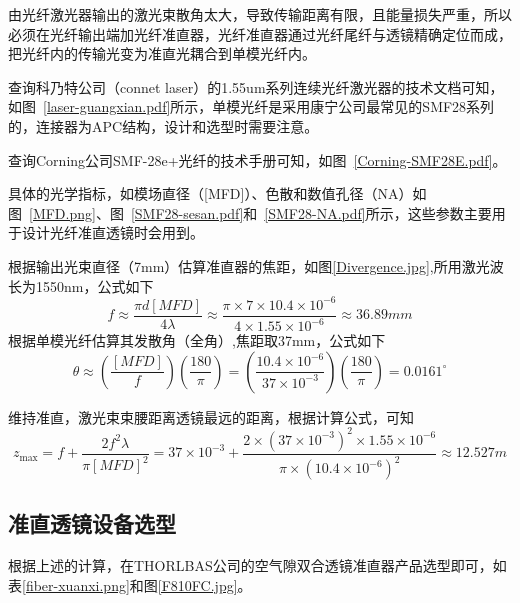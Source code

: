 
由光纤激光器输出的激光束散角太大，导致传输距离有限，且能量损失严重，所以必须在光纤输出端加光纤准直器，光纤准直器通过光纤尾纤与透镜精确定位而成，把光纤内的传输光变为准直光耦合到单模光纤内。

查询科乃特公司（connet laser）的1.55um系列连续光纤激光器的技术文档可知，如图~\ref{laser-guangxian.pdf}所示，单模光纤是采用康宁公司最常见的SMF28系列的，连接器为APC结构，设计和选型时需要注意。


查询Corning公司SMF-28e+光纤的技术手册可知，如图~\ref{Corning-SMF28E.pdf}。


具体的光学指标，如模场直径（[MFD]）、色散和数值孔径（NA）如图~\ref{MFD.png}、图~\ref{SMF28-sesan.pdf}和~\ref{SMF28-NA.pdf}所示，这些参数主要用于设计光纤准直透镜时会用到。


根据输出光束直径（7mm）估算准直器的焦距，如图\ref{Divergence.jpg},所用激光波长为1550nm，公式如下
$$ f \approx \frac { \pi d [ M F D ]} {  4 \lambda  }  \approx \frac { \pi \times 7 \times 10.4 \times 10^{-6}} {  4 \times 1.55 \times 10^{-6}  } \approx 36.89 mm $$
根据单模光纤估算其发散角（全角）,焦距取37mm，公式如下
$$ \theta \approx \left( \frac { [ M F D ] } { f } \right) \left( \frac { 180 } { \pi } \right) =  \left( \frac { 10.4 \times 10^{-6}} { 37 \times 10^{-3} } \right) \left( \frac { 180 } { \pi } \right) =  0.0161 ^{\circ} $$

维持准直，激光束束腰距离透镜最远的距离，根据计算公式，可知
$$ z _ { \max } = f + \frac { 2 f ^ { 2 } \lambda } { \pi [ M F D ] ^ { 2 } } =  37\times 10^{-3} + \frac { 2 \times\left(37\times 10^{-3}\right)^ { 2 } \times 1.55\times 10^{-6} } { \pi \times\left({10.4\times 10^{-6}} \right)^ { 2 } } \approx 12.527 m  $$

\subsection{准直透镜设备选型}
根据上述的计算，在THORLBAS公司的空气隙双合透镜准直器产品选型即可，如表\ref{fiber-xuanxi.png}和图\ref{F810FC.jpg}。

